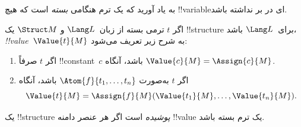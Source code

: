 \documentclass[../../../include/open-logic-section]{subfiles}
\begin{document}


\begin{explain}
به یاد آورید که یک ترم هنگامی \emph{بسته} است که هیچ !!{variable}ای
در بر نداشته باشد.
\end{explain}

\begin{defn}
اگر $t$ ترمی بسته از زبان~$\Lang L$ و $\Struct M$ یک !!{structure}
برای~$\Lang L$ باشد، \emph{!!{value}}~$\Value{t}{M}$ به شرح زیر
تعریف می‌شود:
\begin{enumerate}
\item اگر $t$ صرفاً !!{constant}~$c$ باشد، آنگاه $\Value{c}{M} = \Assign{c}{M}$.
\item اگر $t$ به‌صورت $\Atom{f}{t_1, \ldots, t_n}$ باشد، آنگاه
  \[
  \Value{t}{M} = \Assign{f}{M}(\Value{t_1}{M}, \ldots,
  \Value{t_n}{M}).
  \]
\end{enumerate}
\end{defn}

\begin{defn}
یک !!{structure} \emph{پوشیده} است اگر هر عنصر دامنه !!{value} یک
ترم بسته باشد.
\end{defn}
\end{document}
